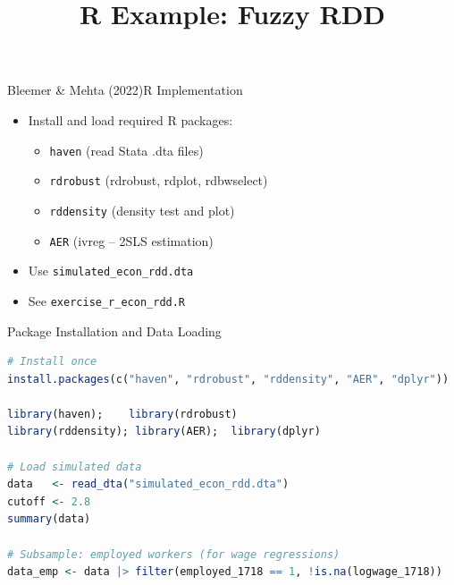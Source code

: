 \documentclass[dvipsnames,hyperref={pdfpagelabels=false}]{beamer}
\begin{document}

\title[]
{R Example: Fuzzy RDD}

\author
{}

\institute{}

\date
{}

\begin{frame}{}
	\titlepage
\end{frame}


\begin{frame}{Bleemer \& Mehta (2022)}{R Implementation}
	\begin{itemize}
		\item Install and load required R packages:
		\begin{itemize}
			\vspace{0.2cm}
			\item \texttt{haven} (read Stata .dta files)
			\vspace{0.2cm}
			\item \texttt{rdrobust} (rdrobust, rdplot, rdbwselect)
			\vspace{0.2cm}
			\item \texttt{rddensity} (density test and plot)
			\vspace{0.2cm}
			\item \texttt{AER} (ivreg -- 2SLS estimation)
		\end{itemize}
		\vspace{0.2cm}
		\item Use \texttt{simulated\_econ\_rdd.dta}
		\vspace{0.2cm}
		\item See \texttt{exercise\_r\_econ\_rdd.R}
	\end{itemize}
\end{frame}


\begin{frame}[fragile]{Package Installation and Data Loading}
\begin{lstlisting}[language=R]
# Install once
install.packages(c("haven", "rdrobust", "rddensity", "AER", "dplyr"))

library(haven);    library(rdrobust)
library(rddensity); library(AER);  library(dplyr)

# Load simulated data
data   <- read_dta("simulated_econ_rdd.dta")
cutoff <- 2.8
summary(data)

# Subsample: employed workers (for wage regressions)
data_emp <- data |> filter(employed_1718 == 1, !is.na(logwage_1718))
\end{lstlisting}
\end{frame}
\end{document}
